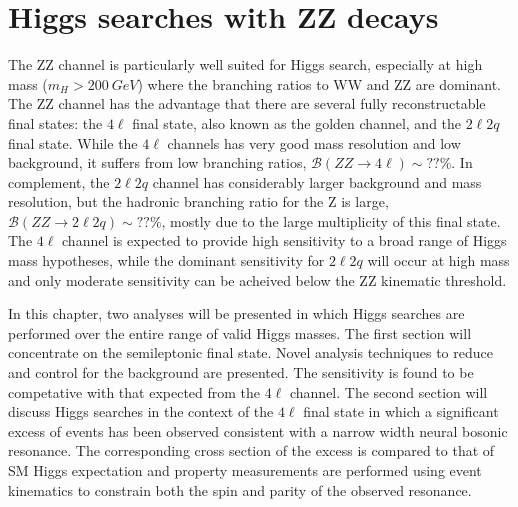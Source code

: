 \chapter{Higgs searches with ZZ decays}
\label{sec:HZZsearches}

The ZZ channel is particularly well suited for Higgs search, especially 
at high mass ($m_H>200~GeV$)
where the branching ratios to WW and ZZ are dominant.  The ZZ channel 
has the advantage that there are several fully reconstructable final
states: the $4\ell$ final state, also known as the golden channel, and
the $2\ell 2q$ final state.  While the $4\ell$ channels has very good 
mass resolution and low background, it suffers from low branching ratios,
$\mathscr{B}(ZZ\to 4\ell)\sim??$\%.  In complement, the $2\ell2q$
channel has considerably larger background and mass resolution, but the
hadronic branching ratio for the Z is large, 
$\mathscr{B}(ZZ\to 2\ell2q)\sim??\%$, mostly due to the large 
multiplicity of this final state.  The $4\ell$ channel is expected to 
provide high sensitivity to a broad range of Higgs mass hypotheses, while
the dominant sensitivity for $2\ell 2q$ will occur at high mass and only 
moderate sensitivity can be acheived below the ZZ kinematic threshold.

In this chapter, two analyses will be presented in which Higgs searches
are performed over the entire range of valid Higgs masses.  The first 
section will concentrate on the semileptonic final state.  Novel analysis
techniques to reduce and control for the background are presented.  
The sensitivity is found to be competative with that expected from the 
$4\ell$ channel.  The second section will discuss Higgs searches in the 
context of the $4\ell$ final state in which a significant excess of 
events has been observed consistent with a narrow width neural bosonic
resonance.  The corresponding cross section of the excess
is compared to that of SM Higgs expectation and property
measurements are performed using event kinematics to constrain both the 
spin and parity of the observed resonance. 

